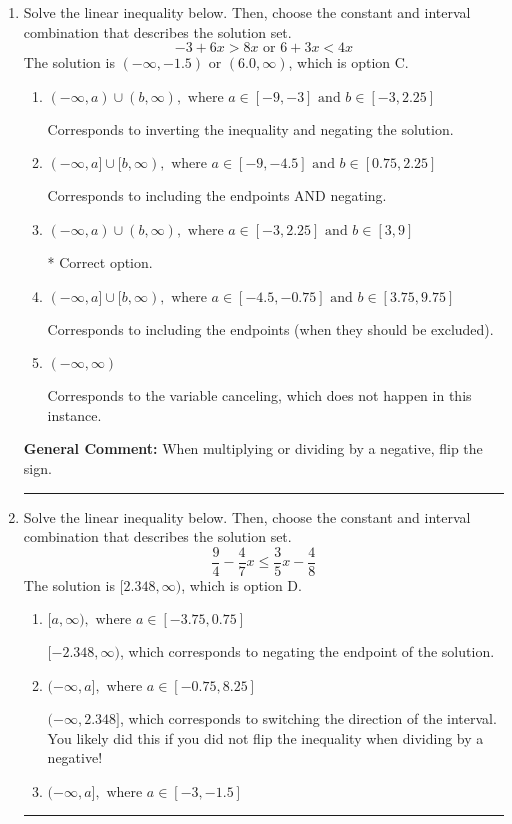 \documentclass{extbook}[14pt]
\newcommand{\litem}[1]{\item #1

\rule{\textwidth}{0.4pt}}
\begin{document}
\begin{enumerate}\litem{
Solve the linear inequality below. Then, choose the constant and interval combination that describes the solution set.
\[ -3 + 6 x > 8 x \text{ or } 6 + 3 x < 4 x \]The solution is \( (-\infty, -1.5) \text{ or } (6.0, \infty) \), which is option C.\begin{enumerate}[label=\Alph*.]
\item \( (-\infty, a) \cup (b, \infty), \text{ where } a \in [-9, -3] \text{ and } b \in [-3, 2.25] \)

Corresponds to inverting the inequality and negating the solution.
\item \( (-\infty, a] \cup [b, \infty), \text{ where } a \in [-9, -4.5] \text{ and } b \in [0.75, 2.25] \)

Corresponds to including the endpoints AND negating.
\item \( (-\infty, a) \cup (b, \infty), \text{ where } a \in [-3, 2.25] \text{ and } b \in [3, 9] \)

 * Correct option.
\item \( (-\infty, a] \cup [b, \infty), \text{ where } a \in [-4.5, -0.75] \text{ and } b \in [3.75, 9.75] \)

Corresponds to including the endpoints (when they should be excluded).
\item \( (-\infty, \infty) \)

Corresponds to the variable canceling, which does not happen in this instance.
\end{enumerate}

\textbf{General Comment:} When multiplying or dividing by a negative, flip the sign.
}
\litem{
Solve the linear inequality below. Then, choose the constant and interval combination that describes the solution set.
\[ \frac{9}{4} - \frac{4}{7} x \leq \frac{3}{5} x - \frac{4}{8} \]The solution is \( [2.348, \infty) \), which is option D.\begin{enumerate}[label=\Alph*.]
\item \( [a, \infty), \text{ where } a \in [-3.75, 0.75] \)

 $[-2.348, \infty)$, which corresponds to negating the endpoint of the solution.
\item \( (-\infty, a], \text{ where } a \in [-0.75, 8.25] \)

 $(-\infty, 2.348]$, which corresponds to switching the direction of the interval. You likely did this if you did not flip the inequality when dividing by a negative!
\item \( (-\infty, a], \text{ where } a \in [-3, -1.5] \)


\end{enumerate}}
\end{enumerate}
\end{document}
